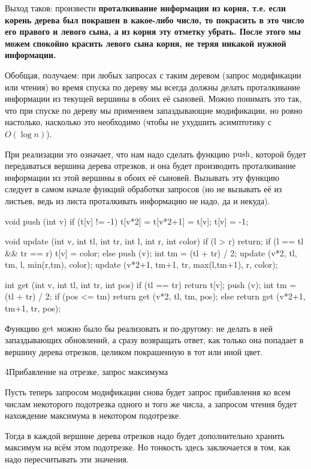 Выход таков: произвести \bf{проталкивание} информации из корня, т.е. если корень дерева был покрашен в какое-либо число, то покрасить в это число его правого и левого сына, а из корня эту отметку убрать. После этого мы можем спокойно красить левого сына корня, не теряя никакой нужной информации.

Обобщая, получаем: при любых запросах с таким деревом (запрос модификации или чтения) во время спуска по дереву мы всегда должны делать проталкивание информации из текущей вершины в обоих её сыновей. Можно понимать это так, что при спуске по дереву мы применяем запаздывающие модификации, но ровно настолько, насколько это необходимо (чтобы не ухудшить асимптотику с $O (\log n)$).

При реализации это означает, что нам надо сделать функцию $\rm push$, которой будет передаваться вершина дерева отрезков, и она будет производить проталкивание информации из этой вершины в обоих её сыновей. Вызывать эту функцию следует в самом начале функций обработки запросов (но не вызывать её из листьев, ведь из листа проталкивать информацию не надо, да и некуда).

\code
void push (int v) {
	if (t[v] != -1) {
		t[v*2] = t[v*2+1] = t[v];
		t[v] = -1;
	}
}

void update (int v, int tl, int tr, int l, int r, int color) {
	if (l > r)
		return;
	if (l == tl && tr == r)
		t[v] = color;
	else {
		push (v);
		int tm = (tl + tr) / 2;
		update (v*2, tl, tm, l, min(r,tm), color);
		update (v*2+1, tm+1, tr, max(l,tm+1), r, color);
	}
}

int get (int v, int tl, int tr, int pos) {
	if (tl == tr)
		return t[v];
	push (v);
	int tm = (tl + tr) / 2;
	if (pos <= tm)
		return get (v*2, tl, tm, pos);
	else
		return get (v*2+1, tm+1, tr, pos);
}
\endcode

Функцию $\rm get$ можно было бы реализовать и по-другому: не делать в ней запаздывающих обновлений, а сразу возвращать ответ, как только она попадает в вершину дерева отрезков, целиком покрашенную в тот или иной цвет.

\h4{Прибавление на отрезке, запрос максимума}

Пусть теперь запросом модификации снова будет запрос прибавления ко всем числам некоторого подотрезка одного и того же числа, а запросом чтения будет нахождение максимума в некотором подотрезке.

Тогда в каждой вершине дерева отрезков надо будет дополнительно хранить максимум на всём этом подотрезке. Но тонкость здесь заключается в том, как надо пересчитывать эти значения.

